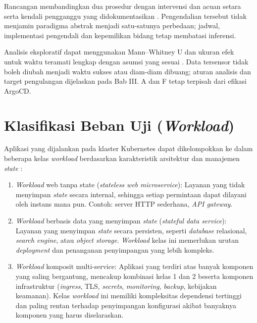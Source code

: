 Rancangan membandingkan dua prosedur dengan intervensi dan acuan setara serta kendali pengganggu yang didokumentasikan \citep{wohlin2012experimentation}. Pengendalian tersebut tidak menjamin paradigma abstrak menjadi satu-satunya perbedaan; jadwal, implementasi pengendali dan kepemilikan bidang tetap membatasi inferensi.

Analisis eksploratif dapat menggunakan Mann--Whitney U dan ukuran efek untuk waktu teramati lengkap dengan asumsi yang sesuai \citep{wohlin2012experimentation,rahman2019properties}. Data tersensor tidak boleh diubah menjadi waktu sukses atau diam-diam dibuang; aturan analisis dan target pengulangan dijelaskan pada Bab III. A dan F tetap terpisah dari efikasi ArgoCD.

\section{Klasifikasi Beban Uji (\textit{Workload})}

Aplikasi yang dijalankan pada klaster Kubernetes dapat dikelompokkan ke dalam beberapa kelas \textit{workload} berdasarkan karakteristik arsitektur dan manajemen \textit{state} \citep{siddiqui2023microservices, aghili2024workload}:

\begin{enumerate}
  \item \textit{Workload} web tanpa state (\textit{stateless web microservice}): Layanan yang tidak menyimpan \textit{state} secara internal, sehingga setiap permintaan dapat dilayani oleh instans mana pun. Contoh: server HTTP sederhana, \textit{API gateway}.
  
  \item \textit{Workload} berbasis data yang menyimpan \textit{state} (\textit{stateful data service}): Layanan yang menyimpan \textit{state} secara persisten, seperti \textit{database} relasional, \textit{search engine}, atau \textit{object storage}. \textit{Workload} kelas ini memerlukan urutan \textit{deployment} dan penanganan penyimpangan yang lebih kompleks.
  
  \item \textit{Workload} komposit multi-service: Aplikasi yang terdiri atas banyak komponen yang saling bergantung, mencakup kombinasi kelas 1 dan 2 beserta komponen infrastruktur (\textit{ingress}, TLS, \textit{secrets}, \textit{monitoring}, \textit{backup}, kebijakan keamanan). Kelas \textit{workload} ini memiliki kompleksitas dependensi tertinggi dan paling rentan terhadap penyimpangan konfigurasi akibat banyaknya komponen yang harus diselaraskan.
\end{enumerate}

